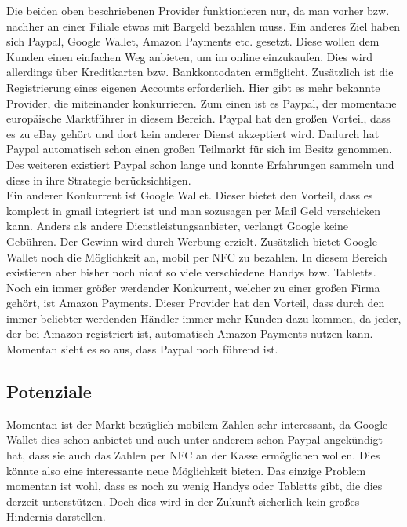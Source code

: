 Die beiden oben beschriebenen Provider funktionieren nur, da man vorher bzw. nachher an einer Filiale etwas mit Bargeld bezahlen muss. Ein anderes Ziel haben sich Paypal, Google Wallet, Amazon Payments etc. gesetzt. Diese wollen dem Kunden einen einfachen Weg anbieten, um im online einzukaufen. Dies wird allerdings über Kreditkarten bzw. Bankkontodaten ermöglicht. Zusätzlich ist die Registrierung eines eigenen Accounts erforderlich. Hier gibt es mehr bekannte Provider, die miteinander konkurrieren. Zum einen ist es Paypal, der momentane europäische Marktführer in diesem Bereich. Paypal hat den großen Vorteil, dass es zu eBay gehört und dort kein anderer Dienst akzeptiert wird. Dadurch hat Paypal automatisch schon einen großen Teilmarkt für sich im Besitz genommen. Des weiteren existiert Paypal schon lange und konnte Erfahrungen sammeln und diese in ihre Strategie berücksichtigen.\\

Ein anderer Konkurrent ist Google Wallet. Dieser bietet den Vorteil, dass es komplett in gmail integriert ist und man sozusagen per Mail Geld verschicken kann. Anders als andere Dienstleistungsanbieter, verlangt Google keine Gebühren. Der Gewinn wird durch Werbung erzielt. Zusätzlich bietet Google Wallet noch die Möglichkeit an, mobil per NFC zu bezahlen. In diesem Bereich existieren aber bisher noch nicht so viele verschiedene Handys bzw. Tabletts.\\

Noch ein immer größer werdender Konkurrent, welcher zu einer großen Firma gehört, ist Amazon Payments. Dieser Provider hat den Vorteil, dass durch den immer beliebter werdenden Händler immer mehr Kunden dazu kommen, da jeder, der bei Amazon registriert ist, automatisch Amazon Payments nutzen kann.\\

Momentan sieht es so aus, dass Paypal noch führend ist.

\subsection{Potenziale}
Momentan ist der Markt bezüglich mobilem Zahlen sehr interessant, da Google Wallet dies schon anbietet und auch unter anderem schon Paypal angekündigt hat, dass sie auch das Zahlen per NFC an der Kasse ermöglichen wollen. Dies könnte also eine interessante neue Möglichkeit bieten. Das einzige Problem momentan ist wohl, dass es noch zu wenig Handys oder Tabletts gibt, die dies derzeit unterstützen. Doch dies wird in der Zukunft sicherlich kein großes Hindernis darstellen.



